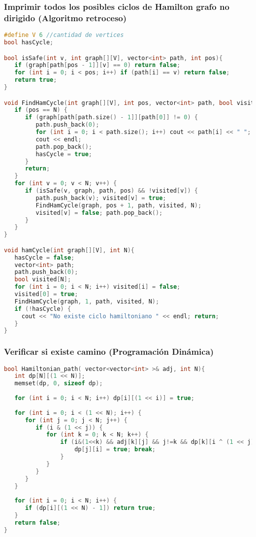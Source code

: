 \subsubsection{Imprimir todos los posibles ciclos de Hamilton grafo no dirigido (Algoritmo retroceso)}
\begin{lstlisting}[language=C++]
#define V 6 //cantidad de vertices
bool hasCycle;

bool isSafe(int v, int graph[][V], vector<int> path, int pos){
   if (graph[path[pos - 1]][v] == 0) return false;
   for (int i = 0; i < pos; i++) if (path[i] == v) return false;
   return true;
}

void FindHamCycle(int graph[][V], int pos, vector<int> path, bool visited[], int N) {
   if (pos == N) {
      if (graph[path[path.size() - 1]][path[0]] != 0) {
         path.push_back(0);
         for (int i = 0; i < path.size(); i++) cout << path[i] << " ";
         cout << endl;
         path.pop_back();
         hasCycle = true;
      }
      return;
   }
   for (int v = 0; v < N; v++) {
      if (isSafe(v, graph, path, pos) && !visited[v]) {
         path.push_back(v); visited[v] = true;
         FindHamCycle(graph, pos + 1, path, visited, N);
         visited[v] = false; path.pop_back();
      }
   }
}

void hamCycle(int graph[][V], int N){
   hasCycle = false;
   vector<int> path;
   path.push_back(0);
   bool visited[N];
   for (int i = 0; i < N; i++) visited[i] = false;
   visited[0] = true;
   FindHamCycle(graph, 1, path, visited, N);
   if (!hasCycle) {
     cout << "No existe ciclo hamiltoniano " << endl; return;
   }
}
\end{lstlisting}

\subsubsection{Verificar si existe camino (Programación Dinámica)}
\begin{lstlisting}[language=C++]
bool Hamiltonian_path( vector<vector<int> >& adj, int N){
   int dp[N][(1 << N)];
   memset(dp, 0, sizeof dp);
   
   for (int i = 0; i < N; i++) dp[i][(1 << i)] = true;
	
   for (int i = 0; i < (1 << N); i++) {
      for (int j = 0; j < N; j++) {
         if (i & (1 << j)) {
            for (int k = 0; k < N; k++) {
                if (i&(1<<k) && adj[k][j] && j!=k && dp[k][i ^ (1 << j)]){
                	dp[j][i] = true; break;
                }
            }
         }
      }
   }
	
   for (int i = 0; i < N; i++) {
      if (dp[i][(1 << N) - 1]) return true;
   }
   return false;
}
\end{lstlisting}


